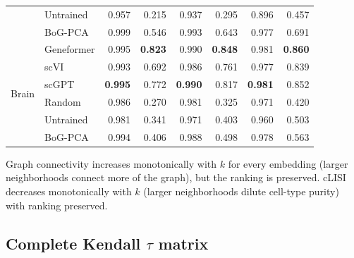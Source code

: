 \documentclass[10pt,letterpaper]{article}
\begin{document}
\begin{table}[h!]
\begin{tabular}{@{}ll rr rr rr@{}}
 & Untrained  & 0.957 & 0.215 & 0.937 & 0.295 & 0.896 & 0.457 \\
 & BoG-PCA    & 0.999 & 0.546 & 0.993 & 0.643 & 0.977 & 0.691 \\
\midrule
\multirow{6}{*}{Brain}
 & Geneformer & 0.995 & \textbf{0.823} & 0.990 & \textbf{0.848} & 0.981 & \textbf{0.860} \\
 & scVI       & 0.993 & 0.692 & 0.986 & 0.761 & 0.977 & 0.839 \\
 & scGPT      & \textbf{0.995} & 0.772 & \textbf{0.990} & 0.817 & \textbf{0.981} & 0.852 \\
 & Random     & 0.986 & 0.270 & 0.981 & 0.325 & 0.971 & 0.420 \\
 & Untrained  & 0.981 & 0.341 & 0.971 & 0.403 & 0.960 & 0.503 \\
 & BoG-PCA    & 0.994 & 0.406 & 0.988 & 0.498 & 0.978 & 0.563 \\
\bottomrule
\end{tabular}
\end{table}

Graph connectivity increases monotonically with $k$ for every embedding (larger neighborhoods connect more of the graph), but the ranking is preserved. cLISI decreases monotonically with $k$ (larger neighborhoods dilute cell-type purity) with ranking preserved.

\subsection{Complete Kendall $\tau$ matrix}
\end{document}
